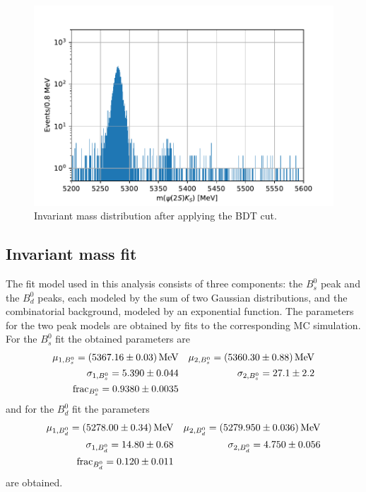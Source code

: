 \begin{figure}[tb]
  \centering
  \includegraphics[width=.8\textwidth]{../plots/signal_window_cut.pdf}
  \caption{Invariant mass distribution after applying the BDT cut.}
  \label{fig:mass_cut}
\end{figure}

\subsection{Invariant mass fit}
The fit model used in this analysis consists of three components: the $B^0_s$ peak and the $B^0_d$ peaks, each modeled by the sum of two Gaussian distributions, and the combinatorial background, modeled by an exponential function. The parameters for the two peak models are obtained by fits to the corresponding MC simulation. For the $B^0_s$ fit the obtained parameters are
\begin{align*}
  \mu_{1, B^0_s} = \SI{5367.16 \pm 0.03}{\mega\eV} && \mu_{2, B^0_s} = \SI{5360.3 \pm 0.88}{\mega\eV}\\
  \sigma_{1, B^0_s} = \num{5.39 \pm 0.044} && \sigma_{2, B^0_s} = \num{27.1 \pm 2.2}\\
  \mathrm{frac}_{B^0_s} = \num{0.938 \pm 0.0035}
\end{align*}
and for the $B^0_d$ fit the parameters
\begin{align*}
  \mu_{1, B^0_d} = \SI{5278.0 \pm 0.34}{\mega\eV} && \mu_{2, B^0_d} = \SI{5279.95 \pm 0.036}{\mega\eV}\\
  \sigma_{1, B^0_d} = \num{14.8 \pm 0.68} && \sigma_{2, B^0_d} = \num{4.75 \pm 0.056}\\
  \mathrm{frac}_{B^0_d} = \num{0.12 \pm 0.011}
\end{align*}
are obtained.
